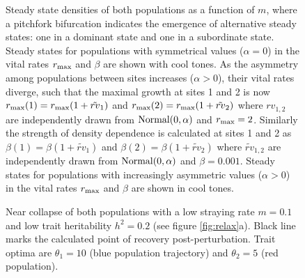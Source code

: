 \documentclass{revtex4}
\begin{document}
\begin{figure}
  \captionsetup{justification=raggedright,
singlelinecheck=false
}
\centering
\caption{
Steady state densities of both populations as a function of $m$, where a pitchfork bifurcation indicates the emergence of alternative steady states: one in a dominant state and one in a subordinate state.
Steady states for populations with symmetrical values ($\alpha=0$) in the vital rates $r_{\rm max}$ and $\beta$ are shown with cool tones.
As the asymmetry among populations between sites increases ($\alpha>0$), their vital rates diverge, such that the maximal growth at sites 1 and 2 is now $r_{\rm max}(1)=r_{\rm max}(1+\tilde{rv}_1)$ and $r_{\rm max}(2)=r_{\rm max}(1+\tilde{rv}_2)$ where $rv_{1,2}$ are independently drawn from $\rm{Normal}(0,\alpha)$ and $r_{\rm max}=2$. 
Similarly the strength of density dependence is calculated at sites 1 and 2 as $\beta(1)=\beta(1+\tilde{rv}_1)$ and $\beta(2)=\beta(1+\tilde{rv}_2)$ where $\tilde{rv}_{1,2}$ are independently drawn from $\rm{Normal}(0,\alpha)$ and $\beta=0.001$.
Steady states for populations with increasingly asymmetric values ($\alpha>0$) in the vital rates $r_{\rm max}$ and $\beta$ are shown in cool tones.
} \label{fig:symmetry}
\end{figure}


\begin{figure}
  \captionsetup{justification=raggedright,
singlelinecheck=false
}
\centering
\caption{
Near collapse of both populations with a low straying rate $m=0.1$ and low trait heritability $h^2=0.2$ (see figure \ref{fig:relax}a).
Black line marks the calculated point of recovery post-perturbation.
Trait optima are $\theta_1 = 10$ (blue population trajectory) and $\theta_2 = 5$ (red population).
} \label{fig:relaxtraj_bothlh}
\end{figure}
\end{document}
